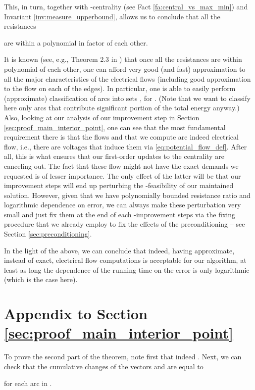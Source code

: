 \documentclass[11pt, letterpaper]{article}
\begin{document}
This, in turn, together with -centrality (see Fact \ref{fa:central_vs_max_min}) and Invariant \ref{inv:measure_upperbound}, allows us to conclude that all the resistances 

are within a polynomial in  factor of each other. 

It is known (see, e.g., Theorem 2.3 in \cite{ChristianoKMST11}) that once all the resistances are within polynomial of each other, one can afford very good (and fast) approximation to all the major characteristics of the electrical flows (including good approximation to the flow on each of the edges). In particular, one is able to easily perform (approximate) classification of arcs into sets , for . (Note that we want to classify here only arcs that contribute significant portion of the total energy anyway.)  Also, looking at our analysis of our improvement step in Section \ref{sec:proof_main_interior_point}, one can see that the most fundamental requirement there is that the flows  and  that we compute are indeed electrical flow, i.e., there are voltages that induce them via \eqref{eq:potential_flow_def}. After all, this is what ensures that our first-order updates to the centrality are canceling out. The fact that these flow might not have the exact demands we requested is of lesser importance. The only effect of the latter will be that our improvement steps will end up perturbing the -feasibility of our maintained solution. However, given that we have polynomially bounded resistance ratio and logarithmic dependence on error, we can always make these perturbation very small and just fix them at the end of each -improvement steps via the fixing procedure that we already employ to fix the effects of the preconditioning -- see Section \ref{sec:preconditioning}. 

In the light of the above, we can conclude that indeed, having approximate, instead of exact, electrical flow computations is acceptable for our algorithm, at least as long the dependence of the running time on the error is only logarithmic (which is the case here). 
 \section{Appendix to Section \ref{sec:proof_main_interior_point}}\label{app:interior}


To prove the second part of the theorem, note first that indeed . Next, we can check that the cumulative changes of the vectors  and  are equal to

for each arc  in . 
\end{document}
